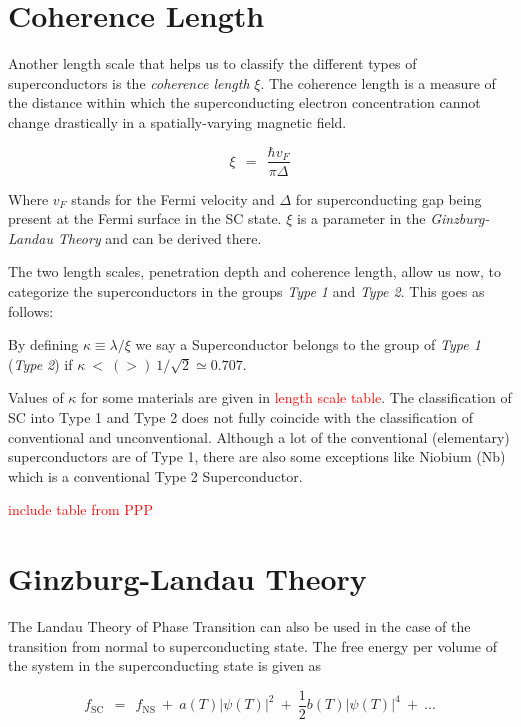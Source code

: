 \documentclass[10pt]{report}
\numberwithin{equation}{chapter}
\begin{document}
\section{Coherence Length}

Another length scale that helps us to classify the different types of superconductors is the \textit{coherence length} $\xi$. The coherence length is a measure of the distance within which the superconducting electron concentration cannot change drastically in a spatially-varying magnetic field.

\begin{equation} \label{eq:coherence_length}
  \xi ~~=~~ \frac{\hbar v_F}{\pi \Delta}
\end{equation}

Where $v_F$ stands for the Fermi velocity and $\Delta$ for superconducting gap being present at the Fermi surface in the SC state. $\xi$ is a parameter in the \textit{Ginzburg-Landau Theory} and can be derived there.

The two length scales, penetration depth and coherence length, allow us now, to categorize the superconductors in the groups \textit{Type 1} and \textit{Type 2}. This goes as follows:

By defining $\kappa \equiv \lambda/\xi$ we say a Superconductor belongs to the group of \textit{Type 1} (\textit{Type 2}) if $\kappa ~<~ (>)~ 1/\sqrt{2} \simeq 0.707 $. 

Values of $\kappa$ for some materials are given in \textcolor{red}{length scale table}. The classification of SC into Type 1 and Type 2 does not fully coincide with the classification of conventional and unconventional. Although a lot of the conventional (elementary) superconductors are of Type 1, there are also some exceptions like Niobium (Nb) which is a conventional Type 2 Superconductor.

\textcolor{red}{include table from PPP}


\section{Ginzburg-Landau Theory}

The Landau Theory of Phase Transition can also be used in the case of the transition from normal to superconducting state. The free energy per volume of the system in the superconducting state is given as

\begin{equation} \label{eq:f_SC}
  f_\text{SC} ~~=~~ f_\text{NS} ~+~ a(T) |\psi(T)|^2 ~+~ \frac{1}{2} b(T) |\psi(T)|^4 ~+~ ...
\end{equation}
\end{document}
